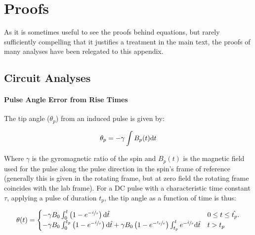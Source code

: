 \documentclass[../PaulGanssle-Thesis.tex]{subfiles}
\begin{document}
\chapter{Proofs}
\label{Proofs}
As it is sometimes useful to see the proofs behind equations, but rarely sufficiently compelling that it justifies a treatment in the main text, the proofs of many analyses have been relegated to this appendix.

\section{Circuit Analyses}
\label{proofs.circuits}


\subsubsection{Pulse Angle Error from Rise Times}
\label{proofs.pulses.rise.times}
The tip angle ($\theta_p$) from an induced pulse is given by:

\begin{equation}
\theta_p = -\gamma \int B_p(t) \mathrm{d} t
\end{equation}

Where $\gamma$ is the gyromagnetic ratio of the spin and $B_p(t)$ is the magnetic field used for the pulse along the pulse direction in the spin's frame of reference (generally this is given in the rotating frame, but at zero field the rotating frame coincides with the lab frame). For a DC pulse with a characteristic time constant $\tau$, applying a pulse of duration $t_p$, the tip angle as a function of time is thus:

\begin{equation}
\theta(t) =\begin{cases}
-\gamma B_{0}\int_{0}^{t}\left(1-e^{-\sfrac{\hat{t}}{\tau}}\right)\mathrm{d}\hat{t} & 0 \leq t \leq \hat{t_p}.\\
-\gamma B_{0}\int_{0}^{t_p}\left(1-e^{-\sfrac{\hat{t}}{\tau}}\right)\mathrm{d}\hat{t} + \gamma B_0\left(1-e^{-\sfrac{t_p}{\tau}}\right)\int_{t_p}^{t}e^{-\sfrac{\hat{t}}{\tau}}\mathrm{d} \hat{t} & t > t_p
\end{cases}
\end{equation}
\end{document}
